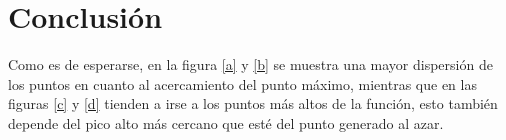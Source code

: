 \documentclass[12pt]{amsart}
\begin{document}
\section{Conclusión}
Como es de esperarse, en la figura \ref{a} y \ref{b} se muestra una mayor dispersión de los puntos en cuanto al acercamiento del punto máximo, mientras que en las figuras \ref{c} y \ref{d} tienden a irse a los puntos más altos de la función, esto también depende del pico alto más cercano que esté del punto generado al azar.

\clearpage


\end{document}
